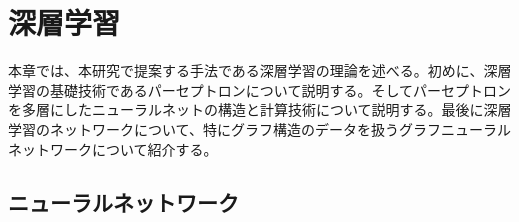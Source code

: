 
\chapter{深層学習} \label{sec:Deeplearning}
本章では、本研究で提案する手法である深層学習の理論を述べる。初めに、深層学習の基礎技術であるパーセプトロンについて説明する。そしてパーセプトロンを多層にしたニューラルネットの構造と計算技術について説明する。最後に深層学習のネットワークについて、特にグラフ構造のデータを扱うグラフニューラルネットワークについて紹介する。
\section{ニューラルネットワーク}

